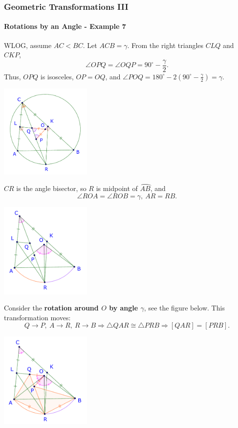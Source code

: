 \documentclass[8pt,xcolor=table,dvipsnames]{beamer}
\newcommand{\dg}{^\circ}
\newcommand{\arc}[1]{\wideparen{#1}}
\begin{document}
\begin{frame}[t]
    \frametitle{Geometric Transformations III}
    \framesubtitle{Rotations by an Angle - Example 7}
    \begin{overprint}
        WLOG, assume $AC<BC$. Let $ACB=\gamma$.
        From the right triangles $CLQ$ and $CKP$, 
        \[
            \angle OPQ=\angle OQP=90\dg - \frac{\gamma}{2}.
        \]
        Thus, $OPQ$ is isosceles, $OP=OQ$, and $\angle POQ=180\dg - 2\left(90\dg - \frac{\gamma}{2}\right)= \gamma$.
        \begin{center}
            \includegraphics[width=4.5cm]{./svg/pdf/imo-2007-4-2.pdf}
        \end{center}
        $CR$ is the angle bisector, so $R$ is midpoint of $\arc{AB}$, and 
        \[
            \angle ROA=\angle ROB=\gamma,\ AR = RB.
        \]
        \begin{center}
            \includegraphics[width=4.5cm]{./svg/pdf/imo-2007-4-3.pdf}
        \end{center}
        Consider the \textbf{rotation around $O$ by angle $\gamma$}, see the figure below.
        This transformation moves:
        \[
            Q \rightarrow P,\ A \rightarrow R,\ R \rightarrow B \Rightarrow \triangle QAR \cong \triangle PRB \Rightarrow [QAR] = [PRB].
        \]
        \begin{center}
            \includegraphics[width=4.5cm]{./svg/pdf/imo-2007-4-4.pdf}

\end{center}
\end{overprint}
\end{frame}
\end{document}
